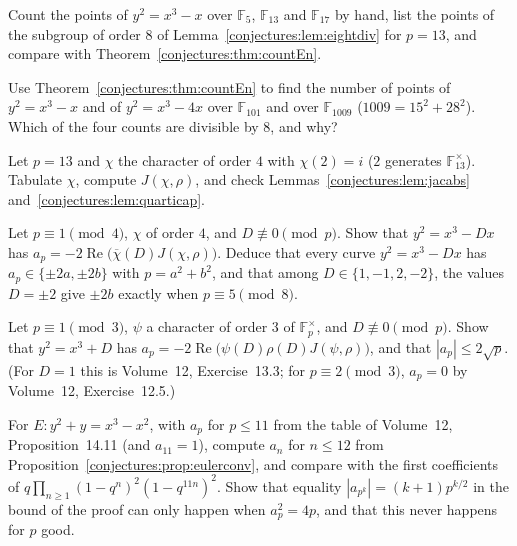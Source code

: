 \begin{exercise}[$\star$]\label{conjectures:ex:handcount}
Count the points of $y^2=x^3-x$ over $\mathbb F_5$, $\mathbb F_{13}$ and $\mathbb F_{17}$ by hand, list the points of the subgroup of order $8$ of
Lemma~\ref{conjectures:lem:eightdiv} for $p=13$, and compare with Theorem~\ref{conjectures:thm:countEn}.
\end{exercise}

\begin{exercise}[$\star$]\label{conjectures:ex:bigp}
Use Theorem~\ref{conjectures:thm:countEn} to find the number of points of $y^2=x^3-x$ and of $y^2=x^3-4x$ over $\mathbb F_{101}$ and over $\mathbb F_{1009}$
($1009=15^2+28^2$). Which of the four counts are divisible by $8$, and why?
\end{exercise}

\begin{exercise}[$\star\star$]\label{conjectures:ex:jac13}
Let $p=13$ and $\chi$ the character of order $4$ with $\chi(2)=i$ ($2$ generates $\mathbb F_{13}^\times$). Tabulate $\chi$, compute $J(\chi,\rho)$, and check
Lemmas~\ref{conjectures:lem:jacabs} and~\ref{conjectures:lem:quarticap}.
\end{exercise}

\begin{exercise}[$\star\star$]\label{conjectures:ex:quarticD}
Let $p\equiv1\pmod4$, $\chi$ of order $4$, and $D\not\equiv0\pmod p$. Show that $y^2=x^3-Dx$ has $a_p=-2\operatorname{Re}\bigl(\overline\chi(D)J(\chi,\rho)\bigr)$.
Deduce that every curve $y^2=x^3-Dx$ has $a_p\in\{\pm2a,\pm2b\}$ with $p=a^2+b^2$, and that among $D\in\{1,-1,2,-2\}$, the values $D=\pm2$ give $\pm2b$ exactly when
$p\equiv5\pmod8$.
\end{exercise}

\begin{exercise}[$\star\star$]\label{conjectures:ex:cubicD}
Let $p\equiv1\pmod3$, $\psi$ a character of order $3$ of $\mathbb F_p^\times$, and $D\not\equiv0\pmod p$. Show that $y^2=x^3+D$ has
$a_p=-2\operatorname{Re}\bigl(\psi(D)\rho(D)J(\psi,\rho)\bigr)$, and that $|a_p|\le2\sqrt p$. (For $D=1$ this is Volume~12, Exercise~13.3; for $p\equiv2\pmod3$,
$a_p=0$ by Volume~12, Exercise~12.5.)
\end{exercise}

\begin{exercise}[$\star\star$]\label{conjectures:ex:anbound}
For $E:y^2+y=x^3-x^2$, with $a_p$ for $p\le11$ from the table of Volume~12, Proposition~14.11 (and $a_{11}=1$), compute $a_n$ for $n\le12$ from
Proposition~\ref{conjectures:prop:eulerconv}, and compare with the first coefficients of $q\prod_{n\ge1}(1-q^n)^2(1-q^{11n})^2$. Show that equality $|a_{p^k}|=(k+1)p^{k/2}$
in the bound of the proof can only happen when $a_p^2=4p$, and that this never happens for $p$ good.
\end{exercise}

